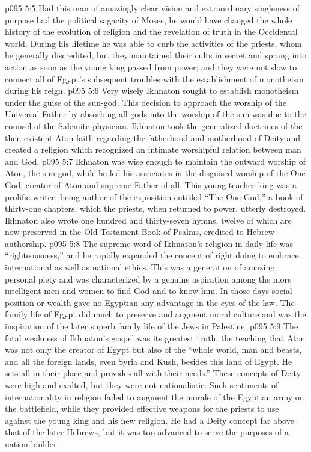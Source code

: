 \vs p095 5:5 Had this man of amazingly clear vision and extraordinary singleness of purpose had the political sagacity of Moses, he would have changed the whole history of the evolution of religion and the revelation of truth in the Occidental world. During his lifetime he was able to curb the activities of the priests, whom he generally discredited, but they maintained their cults in secret and sprang into action as soon as the young king passed from power; and they were not slow to connect all of Egypt’s subsequent troubles with the establishment of monotheism during his reign.
\vs p095 5:6 Very wisely Ikhnaton sought to establish monotheism under the guise of the sun\hyp{}god. This decision to approach the worship of the Universal Father by absorbing all gods into the worship of the sun was due to the counsel of the Salemite physician. Ikhnaton took the generalized doctrines of the then existent Aton faith regarding the fatherhood and motherhood of Deity and created a religion which recognized an intimate worshipful relation between man and God.
\vs p095 5:7 Ikhnaton was wise enough to maintain the outward worship of Aton, the sun\hyp{}god, while he led his associates in the disguised worship of the One God, creator of Aton and supreme Father of all. This young teacher\hyp{}king was a prolific writer, being author of the exposition entitled “The One God,” a book of thirty\hyp{}one chapters, which the priests, when returned to power, utterly destroyed. Ikhnaton also wrote one hundred and thirty\hyp{}seven hymns, twelve of which are now preserved in the Old Testament Book of Psalms, credited to Hebrew authorship.
\vs p095 5:8 \pc The supreme word of Ikhnaton’s religion in daily life was “righteousness,” and he rapidly expanded the concept of right doing to embrace international as well as national ethics. This was a generation of amazing personal piety and was characterized by a genuine aspiration among the more intelligent men and women to find God and to know him. In those days social position or wealth gave no Egyptian any advantage in the eyes of the law. The family life of Egypt did much to preserve and augment moral culture and was the inspiration of the later superb family life of the Jews in Palestine.
\vs p095 5:9 The fatal weakness of Ikhnaton’s gospel was its greatest truth, the teaching that Aton was not only the creator of Egypt but also of the “whole world, man and beasts, and all the foreign lands, even Syria and Kush, besides this land of Egypt. He sets all in their place and provides all with their needs.” These concepts of Deity were high and exalted, but they were not nationalistic. Such sentiments of internationality in religion failed to augment the morale of the Egyptian army on the battlefield, while they provided effective weapons for the priests to use against the young king and his new religion. He had a Deity concept far above that of the later Hebrews, but it was too advanced to serve the purposes of a nation builder.
